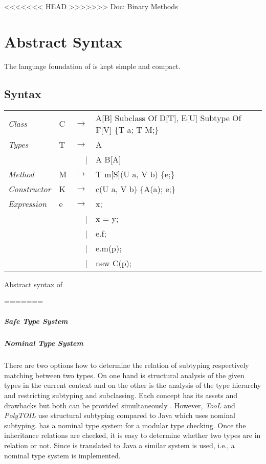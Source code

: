 <<<<<<< HEAD
>>>>>>> Doc: Binary Methods

\chapter{Abstract Syntax}
The language foundation of \ooplss is kept simple and compact. 

\section{Syntax}
\begin{listing}
	\begin{tabular}[H]{llrll}
		\emph{Class}					& C	& $\longrightarrow$ 		& A[B] Subclass Of D[T], E[U] Subtype Of F[V] \{T a; T M;\} \\
		\emph{Types}					& T & $\longrightarrow$ 		& A \\
													&   & 									 | & A \match B[A] \\
		\emph{Method}					& M	& $\longrightarrow$ 		& T m[S](U a, V b) \{e;\} \\
		\emph{Constructor}		& K	& $\longrightarrow$ 		& c(U a, V b) \{A(a); e;\} \\
		\emph{Expression}			& e & $\longrightarrow$ 		& x; \\
													&   & 									 | & x = y; \\
													&   & 									 | & e.f; \\
													&   & 									 | & e.m(p); \\
													&   & 									 | & new C(p); \\
	\end{tabular}
\caption{Abstract syntax of \ooplss}
\label{lst:abstractSyntax}
\end{listing}

=======
\paragraph{Safe Type System}

\paragraph{Nominal Type System}
There are two options how to determine the relation of subtyping
respectively matching between two types. On one hand is structural
analysis of the given types in the current context and on the other
is the analysis of the type hierarchy and restricting subtyping and
subclassing. Each concept has its assets and drawbacks but both can
be provided simultaneously \cite{malayeri_integrating_2008}. However,
\emph{TooL} and \emph{PolyTOIL} use structural subtyping compared to
Java which uses nominal subtyping. \ooplss has a nominal type system
for a modular type checking. Once the inheritance relations are checked,
it is easy to determine whether two types are in relation or not. Since
\ooplss is translated to Java a similar system is used, i.e., a nominal
type system is implemented.

